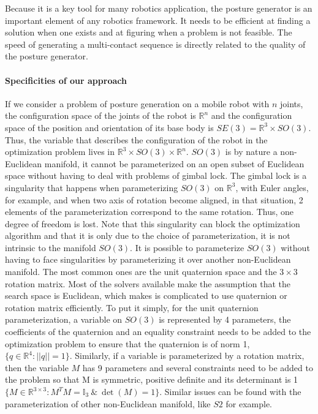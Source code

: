 Because it is a key tool for many robotics application, the posture generator is an important element of any robotics framework.
It needs to be efficient at finding a solution when one exists and at figuring when a problem is not feasible.
The speed of generating a multi-contact sequence is directly related to the quality of the posture generator.

\paragraph{Specificities of our approach}
If we consider a problem of posture generation on a mobile robot with $n$ joints, the configuration space of the joints of the robot is $\mathbb{R}^n$ and the configuration space of the position and orientation of its base body is $SE(3) = \mathbb{R}^3\times SO(3)$.
Thus, the variable that describes the configuration of the robot in the optimization problem lives in $\mathbb{R}^3\times SO(3) \times \mathbb{R}^n$.
$SO(3)$ is by nature a non-Euclidean manifold, it cannot be parameterized on an open subset of Euclidean space without having to deal with problems of gimbal lock.
The gimbal lock is a singularity that happens when parameterizing $SO(3)$ on $\mathbb{R}^3$, with Euler angles, for example, and when two axis of rotation become aligned, in that situation, 2 elements of the parameterization correspond to the same rotation.
Thus, one degree of freedom is lost.
Note that this singularity can block the optimization algorithm and that it is only due to the choice of parameterization, it is not intrinsic to the manifold $SO(3)$.
It is possible to parameterize $SO(3)$ without having to face singularities by parameterizing it over another non-Euclidean manifold.
The most common ones are the unit quaternion space and the $3\times 3$ rotation matrix.
Most of the solvers available make the assumption that the search space is Euclidean, which makes is complicated to use quaternion or rotation matrix efficiently.
To put it simply, for the unit quaternion parameterization, a variable on $SO(3)$ is represented by 4 parameters, the coefficients of the quaternion and an equality constraint needs to be added to the optimization problem to ensure that the quaternion is of norm 1, $\{q\in\mathbb{R}^4:||q||=1\}$.
Similarly, if a variable is parameterized by a rotation matrix, then the variable $M$ has 9 parameters and several constraints need to be added to the problem so that M is symmetric, positive definite and its determinant is 1 $\{M\in\mathbb{R}^{3\times 3}:M^T M = \mathbb{I}_3\  \&\ \det (M) = 1\}$.
Similar issues can be found with the parameterization of other non-Euclidean manifold, like $S2$ for example.

